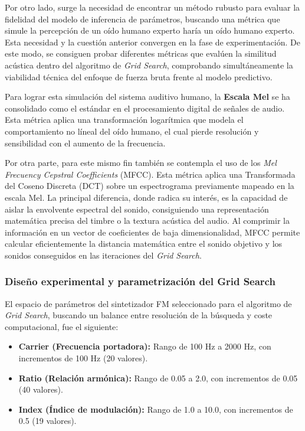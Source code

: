 \documentclass[12pt, a4paper]{article}
\begin{document}
Por otro lado, surge la necesidad de encontrar un método rubusto para evaluar la fidelidad del modelo de inferencia de parámetros, buscando una métrica
que simule la percepción de un oído humano experto haría un oído humano experto. Esta necesidad y la cuestión anterior convergen en la fase de experimentación.
De este modo, se consiguen probar diferentes métricas que evalúen la similitud acústica dentro del algoritmo de \textit{Grid Search}, comprobando
simultáneamente la viabilidad técnica del enfoque de fuerza bruta frente al modelo predictivo.

Para lograr esta simulación del sistema auditivo humano, la \textbf{Escala Mel} se ha consolidado como el estándar en el procesamiento digital de señales de audio.
Esta métrica aplica una transformación logarítmica que modela el comportamiento no líneal del oído humano, el cual pierde resolución y sensibilidad con el aumento de
la frecuencia.

Por otra parte, para este mismo fin también se contempla el uso de los \textit{Mel Frecuency Cepstral Coefficients} (MFCC). Esta métrica aplica una Transformada 
del Coseno Discreta (DCT) sobre un espectrograma previamente mapeado en la escala Mel. La principal diferencia, donde radica su interés, es 
la capacidad de aislar la envolvente espectral del sonido, consiguiendo una representación matemática precisa del 
timbre o la textura acústica del audio. Al comprimir la información en un vector de coeficientes de baja dimensionalidad, 
MFCC permite calcular eficientemente la distancia matemática entre el sonido objetivo y los sonidos conseguidos en las iteraciones
del \textit{Grid Search}.

\subsubsection{Diseño experimental y parametrización del Grid Search}
El espacio de parámetros del sintetizador FM seleccionado para el algoritmo de \textit{Grid Search}, buscando un balance entre resolución de la búsqueda y 
coste computacional, fue el siguiente: 

\begin{itemize}
    \item \textbf{Carrier (Frecuencia portadora):} Rango de 100 Hz a 2000 Hz, con incrementos de 100 Hz (20 valores).
    \item \textbf{Ratio (Relación armónica):} Rango de 0.05 a 2.0, con incrementos de 0.05 (40 valores).
    \item \textbf{Index (Índice de modulación):} Rango de 1.0 a 10.0, con incrementos de 0.5 (19 valores).
\end{itemize}
\end{document}
